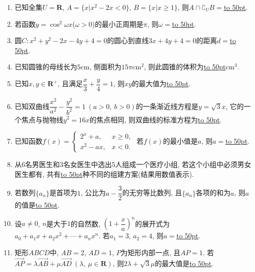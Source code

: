 \documentclass[10pt,a4paper]{article}
\newcommand{\blank}[1]{\underline{\hbox to #1pt{}}}
\begin{document}
\begin{enumerate}[1.]
\begin{center}
\end{center}


\item 已知全集$U=\mathbf{R}$, $A=\{x|x^2-2x<0\}$, $B=\{x|x\ge 1\}$, 则$A\cap \complement_U B=$\blank{50}.
\item 若函数$y=\cos ^2 \omega x$($\omega >0$)的最小正周期是$\pi$, 则$\omega=$\blank{50}.
\item 圆$C:x^2+y^2-2x-4y+4=0$的圆心到直线$3x+4y+4=0$的距离$d=$\blank{50}.
\item 已知圆锥的母线长为$5\text{cm}$, 侧面积为$15 \pi \text{cm}^2$, 则此圆锥的体积为\blank{50}$\text{cm}^3$.
\item 已知$x,y\in \mathbf{R}^+$, 且满足$\dfrac x3+\dfrac y4=1$, 则$xy$的最大值为\blank{50}.
\item 已知双曲线$\dfrac{x^2}{a^2}-\dfrac{y^2}{b^2}=1 \ (a>0,\ b>0)$的一条渐近线方程是$y=\sqrt3x$, 它的一个焦点与抛物线$y^2=16x$的焦点相同, 则双曲线的标准方程为\blank{50}.
\item 已知函数$f(x)=\begin{cases}2^x +a, & x\ge 0, \\ x^2-ax, & x<0.\end{cases}$ 若$f(x)$的最小值是$a$, 则$a=$\blank{50}.
\item 从$6$名男医生和$3$名女医生中选出$5$人组成一个医疗小组, 若这个小组中必须男女医生都有, 共有\blank{50}种不同的组建方案(结果用数值表示).
\item 若数列$\{a_n\}$是首项为$1$, 公比为$a-\dfrac32$的无穷等比数列, 且$\{a_n\}$各项的和为$a$, 则$a$的值是\blank{50}.
\item 设$a\ne 0$, $n$是大于$1$的自然数, $(1+\dfrac xa)^n$的展开式为$a_0+a_1x+a_2x^2+\cdots+a_nx^n$. 若$a_1=3$, $a_2=4$, 则$a=$\blank{50}.
\item 矩形$ABCD$中, $AB=2$, $AD=1$, $P$为矩形内部一点, 且$AP=1$. 若$\overrightarrow{AP}=\lambda \overrightarrow{AB}+\mu \overrightarrow{AD} \ (\lambda,\ \mu \in \mathbf{R})$, 则$2 \lambda +\sqrt3\mu$的最大值是\blank{50}.


\end{enumerate}
\end{document}
